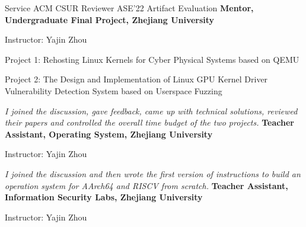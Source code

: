 \begin{rubric}{Service}
\entry*[2024] 
    ACM CSUR Reviewer
\entry*[2022] 
    ASE'22 Artifact Evaluation 
\entry*[2020.09 -- 2021.06] 
    \textbf{Mentor, Undergraduate Final Project, Zhejiang University}
    \par Instructor: Yajin Zhou
    \par {Project 1: Rehosting Linux Kernels for Cyber Physical Systems based on QEMU}
    \par {Project 2: The Design and Implementation of Linux GPU Kernel Driver Vulnerability Detection System based on Userspace Fuzzing}
    \par \emph{I joined the discussion,  gave feedback, came up with technical solutions,
    reviewed their papers and controlled the overall time budget of the two projects.}
\entry*[2019.09 -- 2020.01] 
    \textbf{Teacher Assistant, Operating System, Zhejiang University}
    \par Instructor: Yajin Zhou
    \par \emph{I joined the discussion and then wrote the first version 
    of instructions to build an operation system for AArch64 and RISCV from scratch.}
\entry*[2019.03 -- 2019.06] 
    \textbf{Teacher Assistant, Information Security Labs, Zhejiang University}
    \par Instructor: Yajin Zhou
\end{rubric}